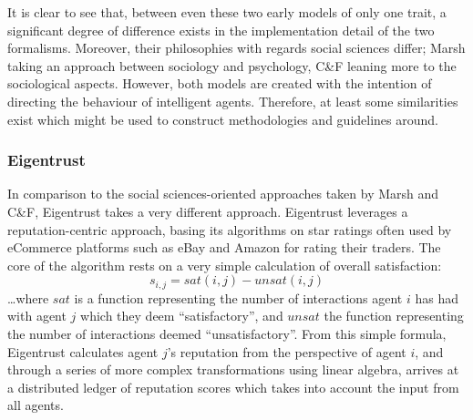 It is clear to see that, between even these two early models of only one trait, a significant degree of difference exists in the implementation detail of the two formalisms. Moreover, their philosophies with regards social sciences differ; Marsh taking an approach between sociology and psychology, C\&F leaning more to the sociological aspects. However, both models are created with the intention of directing the behaviour of intelligent agents. Therefore, at least some similarities exist which might be used to construct methodologies and guidelines around.\par

\subsubsection*{Eigentrust}\label{sec:eigentrust}
In comparison to the social sciences-oriented approaches taken by Marsh and C\&F, Eigentrust\cite{Kamvar2003} takes a very different approach. Eigentrust leverages a reputation-centric approach, basing its algorithms on star ratings often used by eCommerce platforms such as eBay and Amazon for rating their traders. The core of the algorithm rests on a very simple calculation of overall satisfaction:
\[s_{i, j} = sat(i, j) - unsat(i, j)\]
\ldots{}where \(sat\) is a function representing the number of interactions agent \(i\) has had with agent \(j\) which they deem ``satisfactory'', and \(unsat\) the function representing the number of interactions deemed ``unsatisfactory''. From this simple formula, Eigentrust calculates agent \(j\)'s reputation from the perspective of agent \(i\), and through a series of more complex transformations using linear algebra, arrives at a distributed ledger of reputation scores which takes into account the input from all agents.\par

